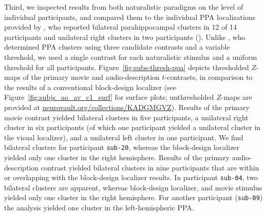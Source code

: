 \documentclass[english,11pt]{article}
\begin{document}

Third, we inspected results from both naturalistic paradigms on the level of
individual participants, and compared them to the individual PPA localizations
provided by \citet{sengupta2016extension}, who reported
bilateral parahippocampal clusters in 12 of 14 participants and unilateral right
clusters in two participants (\citep[see Table~3 in][]{sengupta2016extension}).
Unlike \citet{sengupta2016extension}, who determined PPA clusters using three
candidate contrasts and a variable threshold, we used a single contrast for each
naturalistic stimulus and a uniform threshold for all participants.
Figure~\ref{fig:subs-thresh-ppa} depicts thresholded $Z$-maps of the primary
movie and audio-description $t$-contrasts, in comparison to the results of a
conventional block-design localizer (see Figure~\ref{fig:subjs_ao_av_c1_surf}
for surface plots; unthresholded $Z$-maps are provided at
\href{https://neurovault.org/collections/KADGMGVZ/}{\url{neurovault.org/collections/KADGMGVZ}}).
Results of the primary movie contrast yielded bilateral clusters in five
participants, a unilateral right cluster in six participants (of which one
participant yielded a unilateral cluster in the visual localizer), and a
unilateral left cluster in one participant.
We find bilateral clusters for participant \texttt{sub-20}, whereas the
block-design localizer yielded only one cluster in the right hemisphere.
Results of the primary audio-description contrast yielded bilateral clusters in
nine participants that are within or overlapping with the block-design localizer
results.
In participant \texttt{sub-04}, two bilateral clusters are apparent, whereas
block-design localizer, and movie stimulus yielded only one cluster in the right
hemisphere.
For another participant (\texttt{sub-09}) the analysis yielded one cluster in
the left-hemispheric PPA.
\end{document}
